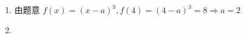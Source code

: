 \documentclass[class=ctexart,crop=false]{standalone}
\begin{document}
    \begin{enumerate}[label=(\arabic*)]
        \item 由题意 $f(x)=(x-a)^3,f(4)=(4-a)^3=8\Rightarrow a=2$
        \item 
    \end{enumerate}
\end{document}
